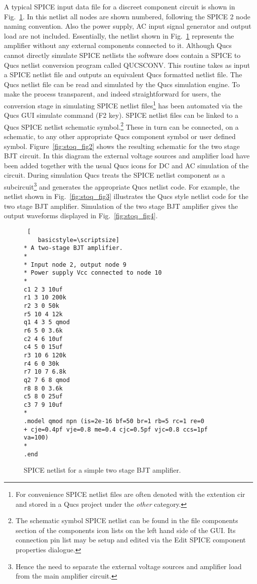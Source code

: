 A typical SPICE input data file for a discreet component circuit is shown in Fig.~\ref{fig:stoq_fig1}.  In this netlist all nodes are shown numbered, following the SPICE 2 node naming convention. Also the power supply, AC input signal generator and output load are not included. Essentially, the netlist shown in Fig.~\ref{fig:stoq_fig1} represents the amplifier without any external components connected to it. Although Qucs cannot directly simulate SPICE netlists the software does contain a SPICE to Qucs netlist conversion program called QUCSCONV. This routine takes as input a SPICE netlist file and outputs an equivalent Qucs formatted netlist file.  The Qucs netlist file can be read and simulated by the Qucs simulation engine.  To make the process transparent, and indeed straightforward for users, the conversion stage in simulating SPICE netlist files\footnote{For convenience SPICE netlist files are often denoted with the extention cir and stored in a Qucs project under the \textit{other} category.} has been automated via the Qucs GUI simulate command (F2 key). SPICE netlist files can be linked to a Qucs SPICE netlist schematic symbol.\footnote{The schematic symbol SPICE netlist can be found in the file components section of the components icon lists on the left hand side of the GUI. Its connection pin list may be setup and edited via the Edit SPICE component properties dialogue.} These in turn can be connected, on a schematic, to any other appropriate Qucs component symbol or user defined symbol. Figure~\ref{fig:stoq_fig2} shows the resulting schematic for the two stage BJT circuit.  In this diagram the external voltage sources and amplifier load have been added together with the usual Qucs icons for DC and AC simulation of the circuit. During simulation Qucs treats the SPICE netlist component as a subcircuit\footnote{Hence the need to separate the external voltage sources and amplifier load from the main amplifier circuit.} and generates the appropriate Qucs netlist code. For example, the netlist shown in Fig.~\ref{fig:stoq_fig3} illustrates the Qucs style netlist code for the two stage BJT amplifier. Simulation of the two stage BJT amplifier gives the output waveforms displayed in Fig.~\ref{fig:stoq_fig4}.

\begin{figure}
  \begin{lstlisting} [
    basicstyle=\scriptsize]
* A two-stage BJT amplifier.
*
* Input node 2, output node 9
* Power supply Vcc connected to node 10
*
c1 2 3 10uf
r1 3 10 200k
r2 3 0 50k
r5 10 4 12k
q1 4 3 5 qmod
r6 5 0 3.6k
c2 4 6 10uf
c4 5 0 15uf
r3 10 6 120k
r4 6 0 30k
r7 10 7 6.8k
q2 7 6 8 qmod
r8 8 0 3.6k
c5 8 0 25uf
c3 7 9 10uf 
*
.model qmod npn (is=2e-16 bf=50 br=1 rb=5 rc=1 re=0
+ cje=0.4pf vje=0.8 me=0.4 cjc=0.5pf vjc=0.8 ccs=1pf va=100)
*
.end
\end{lstlisting} 

  \caption{SPICE netlist for a simple two stage BJT amplifier.}
  \label{fig:stoq_fig1}
\end{figure} 

